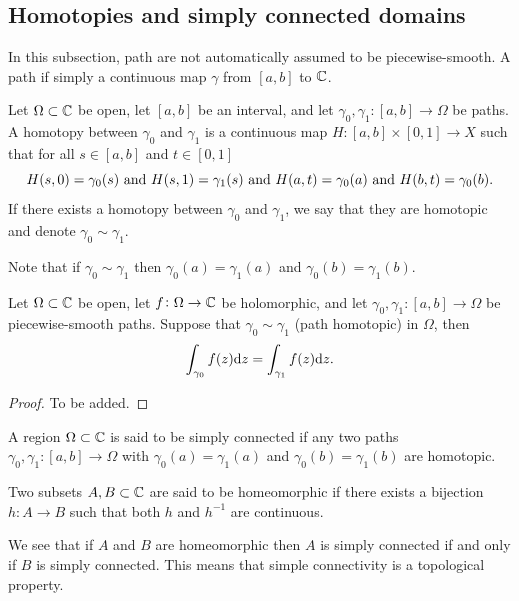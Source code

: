 \documentclass[11pt,a4paper]{article}
\begin{document}
\subsection{Homotopies and simply connected domains}

\begin{remark}
In this subsection, path are not automatically assumed to be piecewise-smooth.
A path if simply a continuous map $\gamma$ from $[a,b]$ to $\mathbb{C}$.
\end{remark}

\begin{definition}
  Let $\Omega \subset \mathbb{C}$ be open,
  let $[a,b]$ be an interval,
  and let $\gamma_0, \gamma_1 \colon [a,b] \to \Omega$ be paths.
  A homotopy between $\gamma_0$ and $\gamma_1$ is a continuous map $H \colon [a,b] \times [0,1] \to X$
  such that for all $s \in [a,b]$ and $t \in [0,1]$
  \[
    H(s,0) = \gamma_0(s) \text{ and }
    H(s,1) = \gamma_1(s) \text{ and }
    H(a,t) = \gamma_0(a) \text{ and }
    H(b,t) = \gamma_0(b).
  \]
  If there exists a homotopy between $\gamma_0$ and $\gamma_1$, we say
  that they are homotopic and denote $\gamma_0 \sim \gamma_1$.
\end{definition}
\begin{remark}
  Note that if $\gamma_0 \sim \gamma_1$ then $\gamma_0(a) = \gamma_1(a)$
  and $\gamma_0(b) = \gamma_1(b)$.
\end{remark}

\begin{theorem}
  \label{thm:homotopic-implies-equal-integrals}
  Let $\Omega \subset \mathbb{C}$ be open,
  let $f \colon \Omega \to \mathbb{C}$ be holomorphic,
  and let $\gamma_0, \gamma_1 \colon [a,b] \to \Omega$ be piecewise-smooth
  paths.
  Suppose that $\gamma_0 \sim \gamma_1$ (path homotopic) in $\Omega$,
  then
  \[
    \int_{\gamma_0} f(z) \mathrm{d} z =
    \int_{\gamma_1} f(z) \mathrm{d} z.
  \]
\end{theorem}
\begin{proof}
  To be added.
\end{proof}

\begin{definition}
  A region $\Omega \subset \mathbb{C}$ is said to be simply connected if any
  two paths $\gamma_0, \gamma_1 \colon [a,b] \to \Omega$ with
  $\gamma_0(a) = \gamma_1(a)$ and $\gamma_0(b) = \gamma_1(b)$ are homotopic.
\end{definition}

\begin{definition}
  Two subsets $A,B \subset \mathbb{C}$ are said to be homeomorphic if there
  exists a bijection $h \colon A \to B$ such that both $h$ and $h^{-1}$
  are continuous.
\end{definition}
\begin{remark}
  We see that if $A$ and $B$ are homeomorphic then $A$ is simply
  connected if and only if $B$ is simply connected.
  This means that simple connectivity is a topological property.
\end{remark}
\end{document}
